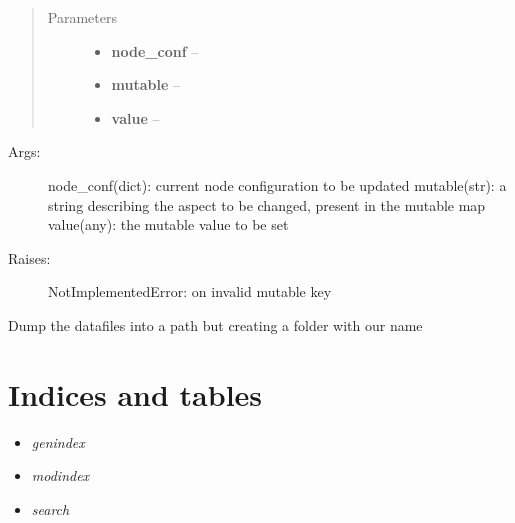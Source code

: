 \documentclass[letterpaper,10pt,english]{sphinxmanual}
\begin{document}
\begin{fulllineitems}
\begin{fulllineitems}
\begin{description}
\end{description}
\begin{quote}\begin{description}
\item[{Parameters}] \leavevmode\begin{itemize}
\item {} 
\textbf{node\_conf} -- 

\item {} 
\textbf{mutable} -- 

\item {} 
\textbf{value} -- 

\end{itemize}

\end{description}\end{quote}
\begin{description}
\item[{Args:}] \leavevmode
node\_conf(dict): current node configuration to be updated
mutable(str): a string describing the aspect to be changed, present in the mutable map
value(any): the mutable value to be set

\item[{Raises:}] \leavevmode
NotImplementedError: on invalid mutable key

\end{description}

\end{fulllineitems}


\begin{fulllineitems}
\label{index:polybos.Scenario.write}
Dump the datafiles into a path but creating a folder with our name

\end{fulllineitems}


\end{fulllineitems}



\chapter{Indices and tables}
\label{index:indices-and-tables}\label{index:welcome-to-aietes-s-documentation}\begin{itemize}
\item {} 
\emph{genindex}

\item {} 
\emph{modindex}

\item {} 
\emph{search}

\end{itemize}
\end{document}
